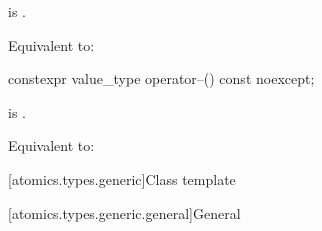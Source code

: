 \begin{itemdescr}
\pnum
\constraints
{} is .

\pnum
\effects
Equivalent to: 
\end{itemdescr}

%
%
\begin{itemdecl}
constexpr value_type operator--() const noexcept;
\end{itemdecl}

\begin{itemdescr}
\pnum
\constraints
{} is .

\pnum
\effects
Equivalent to: 
\end{itemdescr}

[atomics.types.generic]{Class template }

[atomics.types.generic.general]{General}

